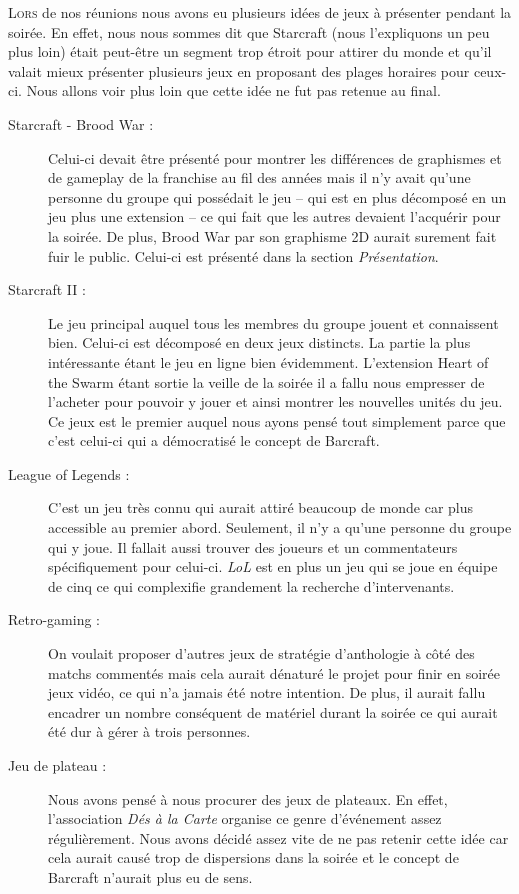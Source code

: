 \lettrine{L}{ors} de nos réunions nous avons eu plusieurs idées de jeux
à présenter pendant la soirée. En effet, nous nous sommes dit que
Starcraft (nous l'expliquons un peu plus loin) était peut-être un
segment trop étroit pour attirer du monde et qu'il valait mieux
présenter plusieurs jeux en proposant des plages horaires pour ceux-ci.
Nous allons voir plus loin que cette idée ne fut pas retenue au final.

\begin{description}

\item[Starcraft - Brood War :] Celui-ci devait être présenté pour
montrer les différences de graphismes et de gameplay de la franchise au
fil des années mais il n'y avait qu'une personne du groupe qui possédait
le jeu -- qui est en plus décomposé en un jeu plus une extension -- ce qui
fait que les autres devaient l'acquérir pour la soirée. De plus, \og
Brood War \fg{} par son graphisme 2D aurait surement fait fuir le public. 
Celui-ci est présenté dans la section \emph{Présentation}.

\item[Starcraft II :] Le jeu principal auquel tous les membres du groupe
jouent et connaissent bien. Celui-ci est décomposé en deux jeux distincts.
La partie la plus intéressante étant le jeu en ligne bien évidemment.
L'extension \og Heart of the Swarm \fg{} étant sortie la veille de la
soirée il a fallu nous empresser de l'acheter pour pouvoir y jouer et
ainsi montrer les nouvelles unités du jeu. Ce jeux est le premier auquel
nous ayons pensé tout simplement parce que c'est celui-ci qui a
démocratisé le concept de Barcraft.

\item[League of Legends :] C'est un jeu très connu qui aurait attiré
beaucoup de monde car plus accessible au premier abord. Seulement, il
n'y a qu'une personne du groupe qui y joue. Il fallait aussi trouver des
joueurs et un commentateurs spécifiquement pour celui-ci. \emph{LoL} est en plus
un jeu qui se joue en équipe de cinq ce qui complexifie grandement la
recherche d'intervenants.

\item[Retro-gaming :] On voulait proposer d'autres jeux de stratégie
d'anthologie à côté des matchs commentés mais cela aurait dénaturé le
projet pour finir en soirée jeux vidéo, ce qui n'a jamais été notre
intention. De plus, il aurait fallu encadrer un nombre conséquent de
matériel durant la soirée ce qui aurait été dur à gérer à trois
personnes.

\item[Jeu de plateau :] Nous avons pensé à nous procurer des jeux de
plateaux. En effet, l'association \emph{Dés à la Carte} organise ce
genre d'événement assez régulièrement. Nous avons décidé assez vite de
ne pas retenir cette idée car cela aurait causé trop de dispersions dans
la soirée et le concept de Barcraft n'aurait plus eu de sens.

\end{description}

